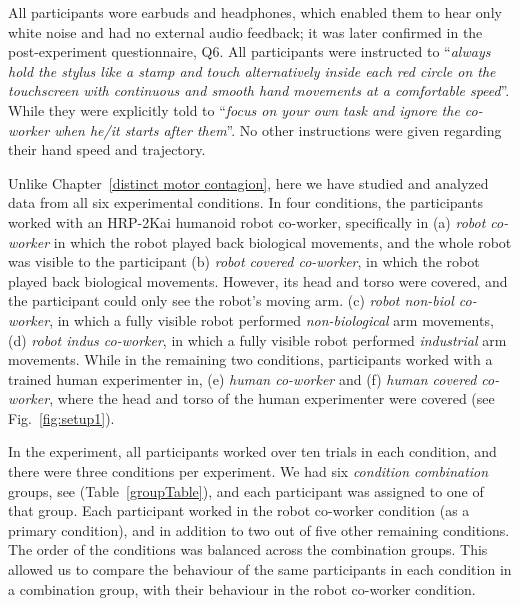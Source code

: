 All participants wore earbuds and headphones, which enabled them to hear only white noise and had no external audio feedback; it was later confirmed in the post-experiment questionnaire, Q6. All participants were instructed to ``{\it always hold the stylus like a stamp and touch alternatively inside each red circle on the touchscreen with continuous and smooth hand movements at a comfortable speed}''. While they were explicitly told to ``{\it focus on your own task and ignore the co-worker when he/it starts after them}''. No other instructions were given regarding their hand speed and trajectory.

Unlike Chapter~\ref{distinct motor contagion}, here we have studied and analyzed data from all six experimental conditions. In four conditions, the participants worked with an HRP-2Kai humanoid robot co-worker, specifically in (a) \textit{robot co-worker} in which the robot played back biological movements, and the whole robot was visible to the participant (b) \textit{robot covered co-worker}, in which the robot played back biological movements. However, its head and torso were covered, and the participant could only see the robot's moving arm. (c) \textit{robot non-biol co-worker}, in which a fully visible robot performed \textit{non-biological} arm movements, (d) \textit{robot indus co-worker}, in which a fully visible robot performed \textit{industrial} arm movements. While in the remaining two conditions, participants worked with a trained human experimenter in, (e) \textit{human co-worker} and (f) \textit{human covered co-worker}, where the head and torso of the human experimenter were covered (see Fig.~\ref{fig:setup1}).

In the experiment, all participants worked over ten trials in each condition, and there were three conditions per experiment. We had six \emph{condition combination} groups, see (Table~\ref{groupTable}), and each participant was assigned to one of that group. Each participant worked in the robot co-worker condition (as a primary condition), and in addition to two out of five other remaining conditions. The order of the conditions was balanced across the combination groups. This allowed us to compare the behaviour of the same participants in each condition in a combination group, with their behaviour in the robot co-worker condition.


